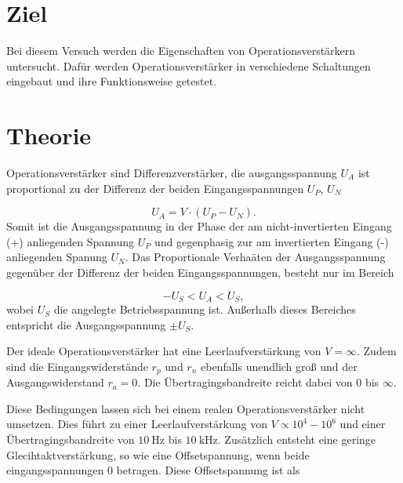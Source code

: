 \section{Ziel}
\label{sec:Ziel}
Bei diesem Versuch werden die Eigenschaften von Operationsverstärkern untersucht. 
Dafür werden Operationsverstärker in verschiedene Schaltungen eingebaut und ihre Funktionsweise getestet.

\section{Theorie}
\label{sec:Theorie}
Operationsverstärker sind Differenzverstärker, die ausgangsspannung $U_A$ ist proportional zu der Differenz der beiden Eingangsspannungen $U_P$, $U_N$

\begin{equation*}
    U_A = V \cdot (U_P - U_N).
\end{equation*}
Somit ist die Ausgangsspannung in der Phase der am nicht-invertierten Eingang (+) anliegenden Spannung $U_P$ und gegenphasig zur am invertierten Eingang (-) anliegenden Spanung $U_N$.
Das Proportionale Verhaäten der Ausgangsspannung gegenüber der Differenz der beiden Eingangsspannungen, besteht nur im Bereich 

\begin{equation*}
    -U_S < U_A < U_S,
\end{equation*}
wobei $U_S$ die angelegte Betriebsspannung ist.
Außerhalb dieses Bereiches entspricht die Ausgangsspannung $\pm U_S$.



Der ideale Operationsverstärker hat eine Leerlaufverstärkung von $V = \infty$.
Zudem sind die Eingangswiderstände $r_p$ und $r_n$ ebenfalls unendlich groß und der Ausgangswiderstand $r_a = 0$.
Die Übertragingsbandreite reicht dabei von 0 bis $\infty$.

Diese Bedingungen lassen sich bei einem realen Operationsverstärker nicht umsetzen.
Dies führt zu einer Leerlaufverstärkung von $V \propto 10^4 - 10^6$ und einer Übertragingsbandreite von $\SI{10}{\hertz}$ bis $\SI{10}{\kilo\hertz}$.
Zusätzlich entsteht eine geringe Glecihtaktverstärkung, so wie eine Offsetspannung, wenn beide eingangsspannungen 0 betragen.
Diese Offsetspannung ist als

